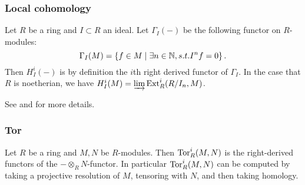 \documentclass[11pt, english]{article}
\begin{document}
\subsubsection{Local cohomology}
\label{localcohomology}
Let $R$ be a ring and $I \subset R$ an ideal. Let $\Gamma_I(-)$ be the following functor on $R$-modules:
\[
\Gamma_I(M) = \left\{ f \in M \mid \exists n \in \mathbb{N}, s.t. I^n f = 0 \right \}.
\]
Then $H_I^i(-)$ is by definition the $i$th right derived functor of $\Gamma_I$.  In the case that $R$ is noetherian, we have $H_I^i(M) = \varinjlim \operatorname{\mathrm{Ext}}^i_R(R/I_n,M)$.

See \cite{eisenbud} and \cite{weibel} for more details. 

\subsubsection{Tor}
\label{tor}
Let $R$ be a ring and $M,N$ be $R$-modules. Then $\operatorname{\mathrm{Tor}}_R^i(M,N)$ is the right-derived functors of the $- \otimes_R N$-functor. In particular $\operatorname{\mathrm{Tor}}_R^i(M,N)$ can be computed by taking a projective resolution of $M$, tensoring with $N$, and then taking homology.



\end{document}
